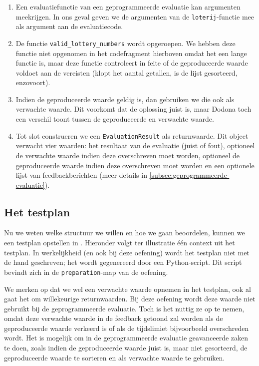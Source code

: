 \begin{enumerate}
    \item Een evaluatiefunctie van een geprogrammeerde evaluatie kan argumenten meekrijgen.
    In ons geval geven we de argumenten van de \texttt{loterij}-functie mee als argument aan de evaluatiecode.
    \item De functie \texttt{valid\_lottery\_numbers} wordt opgeroepen.
    We hebben deze functie niet opgenomen in het codefragment hierboven omdat het een lange functie is, maar deze functie controleert in feite of de geproduceerde waarde voldoet aan de vereisten (klopt het aantal getallen, is de lijst gesorteerd, enzovoort).
    \item Indien de geproduceerde waarde geldig is, dan gebruiken we die ook als verwachte waarde.
    Dit voorkomt dat de oplossing juist is, maar Dodona toch een verschil toont tussen de geproduceerde en verwachte waarde.
    \item Tot slot construeren we een \texttt{EvaluationResult} als returnwaarde.
    Dit object verwacht vier waarden: het resultaat van de evaluatie (juist of fout), optioneel de verwachte waarde indien deze overschreven moet worden, optioneel de geproduceerde waarde indien deze overschreven moet worden en een optionele lijst van feedbackberichten (meer details in \cref{subsec:geprogrammeerde-evaluatie}).
\end{enumerate}

\subsection{Het testplan}\label{subsec:oefening-lotto-testplan}

Nu we weten welke structuur we willen en hoe we gaan beoordelen, kunnen we een testplan opstellen in .
Hieronder volgt ter illustratie één context uit het testplan.
In werkelijkheid (en ook bij deze oefening) wordt het testplan niet met de hand geschreven;
het wordt gegenereerd door een Python-script.
Dit script bevindt zich in de \texttt{preparation}-map van de oefening.

We merken op dat we wel een verwachte waarde opnemen in het testplan, ook al gaat het om willekeurige returnwaarden.
Bij deze oefening wordt deze waarde niet gebruikt bij de geprogrammeerde evaluatie.
Toch is het nuttig ze op te nemen, omdat deze verwachte waarde in de feedback getoond zal worden als de geproduceerde waarde verkeerd is of als de tijdslimiet bijvoorbeeld overschreden wordt.
Het is mogelijk om in de geprogrammeerde evaluatie geavanceerde zaken te doen, zoals indien de geproduceerde waarde juist is, maar niet gesorteerd, de geproduceerde waarde te sorteren en als verwachte waarde te gebruiken.

